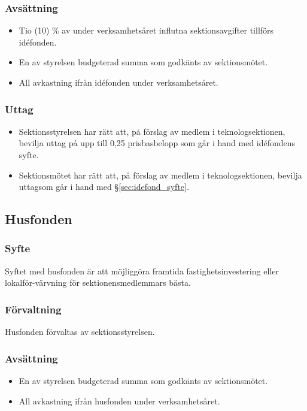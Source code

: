 \documentclass[a4paper, 10pt]{article}
\begin{document}
\subsubsection{Avsättning}
\begin{itemize}
\item Tio (10) \% av under verksamhetsåret influtna sektionsavgifter tillförs idéfonden.
\item En av styrelsen budgeterad summa som godkänts av sektionsmötet.
\item All avkastning ifrån idéfonden under verksamhetsåret.
\end{itemize}
\subsubsection{Uttag}
\begin{itemize}
  \item Sektionsstyrelsen har rätt att, på förslag av medlem i teknologsektionen, bevilja uttag på upp till 0,25 prisbasbelopp som går i hand med idéfondens syfte.
  \item Sektionsmötet har rätt att, på förslag av medlem i teknologsektionen, bevilja uttagsom går i hand med \S\ref{sec:idefond_syfte}.
\end{itemize}

\subsection{Husfonden}
\subsubsection{Syfte}
\label{sec:husfond_syfte}
Syftet med husfonden är att möjliggöra framtida fastighetsinvestering eller lokalför-värvning för sektionensmedlemmars bästa.
\subsubsection{Förvaltning}
Husfonden förvaltas av sektionsstyrelsen.
\subsubsection{Avsättning}
\begin{itemize}
  \item En av styrelsen budgeterad summa som godkänts av sektionsmötet.
  \item All avkastning ifrån husfonden under verksamhetsåret.
\end{itemize}
\end{document}
